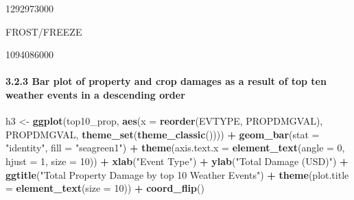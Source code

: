 \documentclass[]{article}
\newenvironment{Shaded}{\begin{snugshade}}{\end{snugshade}}
\newcommand{\DataTypeTok}[1]{\textcolor[rgb]{0.13,0.29,0.53}{#1}}
\newcommand{\DecValTok}[1]{\textcolor[rgb]{0.00,0.00,0.81}{#1}}
\newcommand{\KeywordTok}[1]{\textcolor[rgb]{0.13,0.29,0.53}{\textbf{#1}}}
\newcommand{\NormalTok}[1]{#1}
\newcommand{\OperatorTok}[1]{\textcolor[rgb]{0.81,0.36,0.00}{\textbf{#1}}}
\newcommand{\StringTok}[1]{\textcolor[rgb]{0.31,0.60,0.02}{#1}}
\let\oldparagraph\paragraph
\renewcommand{\paragraph}[1]{\oldparagraph{#1}\mbox{}}
\begin{document}
1292973000

FROST/FREEZE

1094086000

\hypertarget{bar-plot-of-property-and-crop-damages-as-a-result-of-top-ten-weather-events-in-a-descending-order}{%
\paragraph{3.2.3 Bar plot of property and crop damages as a result of
top ten weather events in a descending
order}\label{bar-plot-of-property-and-crop-damages-as-a-result-of-top-ten-weather-events-in-a-descending-order}}

\begin{Shaded}
\begin{Highlighting}[]
\NormalTok{h3 <-}\StringTok{ }\KeywordTok{ggplot}\NormalTok{(top10_prop, }\KeywordTok{aes}\NormalTok{(}\DataTypeTok{x =} \KeywordTok{reorder}\NormalTok{(EVTYPE, PROPDMGVAL), PROPDMGVAL, }\KeywordTok{theme_set}\NormalTok{(}\KeywordTok{theme_classic}\NormalTok{()))) }\OperatorTok{+}\StringTok{ }
\StringTok{        }\KeywordTok{geom_bar}\NormalTok{(}\DataTypeTok{stat =} \StringTok{"identity"}\NormalTok{, }\DataTypeTok{fill =} \StringTok{"seagreen1"}\NormalTok{) }\OperatorTok{+}\StringTok{ }
\StringTok{        }\KeywordTok{theme}\NormalTok{(}\DataTypeTok{axis.text.x =} \KeywordTok{element_text}\NormalTok{(}\DataTypeTok{angle =} \DecValTok{0}\NormalTok{, }\DataTypeTok{hjust =} \DecValTok{1}\NormalTok{, }\DataTypeTok{size =} \DecValTok{10}\NormalTok{)) }\OperatorTok{+}\StringTok{ }
\StringTok{        }
\StringTok{        }\KeywordTok{xlab}\NormalTok{(}\StringTok{"Event Type"}\NormalTok{) }\OperatorTok{+}\StringTok{ }\KeywordTok{ylab}\NormalTok{(}\StringTok{"Total Damage (USD)"}\NormalTok{) }\OperatorTok{+}\StringTok{ }\KeywordTok{ggtitle}\NormalTok{(}\StringTok{"Total Property Damage by top 10 Weather Events"}\NormalTok{) }\OperatorTok{+}
\StringTok{        }\KeywordTok{theme}\NormalTok{(}\DataTypeTok{plot.title =} \KeywordTok{element_text}\NormalTok{(}\DataTypeTok{size =} \DecValTok{10}\NormalTok{)) }\OperatorTok{+}\StringTok{ }\KeywordTok{coord_flip}\NormalTok{()}
\end{Highlighting}
\end{Shaded}
\end{document}
